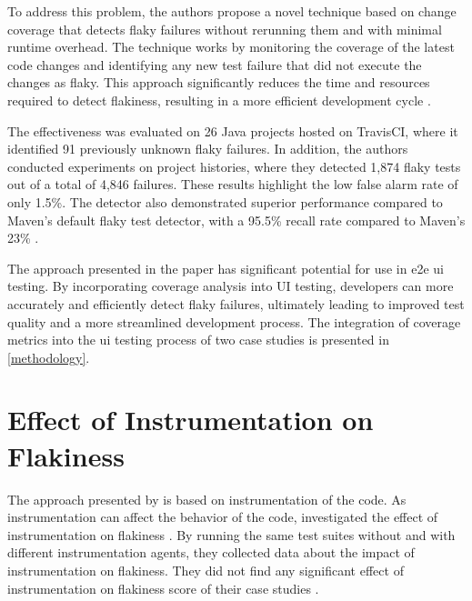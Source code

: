 To address this problem, the authors propose a novel technique based on change coverage that detects flaky failures without rerunning them and with minimal runtime overhead.
The technique works by monitoring the coverage of the latest code changes and identifying any new test failure that did not execute the changes as flaky.
This approach significantly reduces the time and resources required to detect flakiness, resulting in a more efficient development cycle \autocite{bell_deflaker_2018}.

The effectiveness was evaluated on 26 Java projects hosted on TravisCI, where it identified 91 previously unknown flaky failures.
In addition, the authors conducted experiments on project histories, where they detected 1,874 flaky tests out of a total of 4,846 failures.
These results highlight the low false alarm rate of only 1.5\%.
The detector also demonstrated superior performance compared to Maven's default flaky test detector, with a 95.5\% recall rate compared to Maven's 23\% \autocite{bell_deflaker_2018}.

The approach presented in the  paper has significant potential for use in \ac{e2e} \ac{ui} testing.
By incorporating coverage analysis into UI testing, developers can more accurately and efficiently detect flaky failures, ultimately leading to improved test quality and a more streamlined development process.
The integration of coverage metrics into the \ac{ui} testing process of two case studies is presented in \cref{methodology}.

\section{Effect of Instrumentation on Flakiness}
The approach presented by \citeauthor*{bell_deflaker_2018} is based on instrumentation of the code.
As instrumentation can affect the behavior of the code, \citeauthor*{rasheed_effect_2023} investigated the effect of instrumentation on flakiness \autocite{rasheed_effect_2023}.
By running the same test suites without and with different instrumentation agents, they collected data about the impact of instrumentation on flakiness.
They did not find any significant effect of instrumentation on flakiness score of their case studies \autocite{rasheed_effect_2023}.


